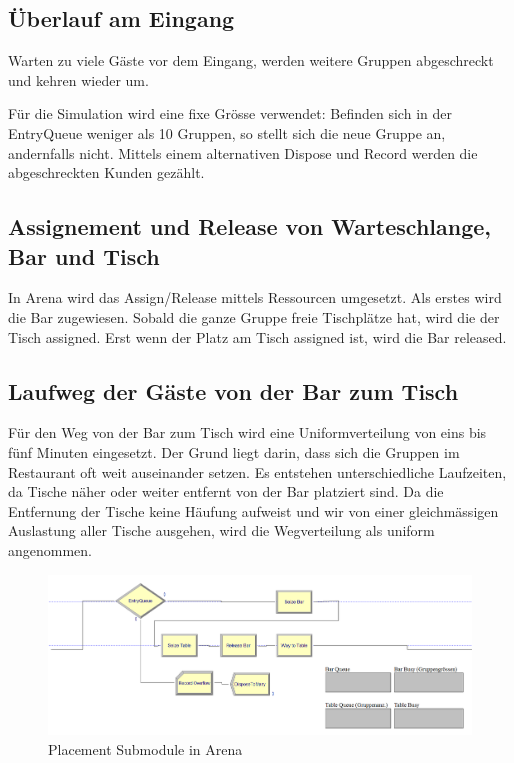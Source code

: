 \documentclass[ngerman,a4paper,12pt]{scrreprt}
\begin{document}
		\subsection{Überlauf am Eingang}
			Warten zu viele Gäste vor dem Eingang, werden weitere Gruppen abgeschreckt und kehren wieder um.
		
			Für die Simulation wird eine fixe Grösse verwendet: 			Befinden sich in der EntryQueue weniger als 10 Gruppen, so stellt sich die neue Gruppe an, andernfalls nicht. Mittels einem alternativen Dispose und Record werden die abgeschreckten Kunden gezählt.
			
			
		\subsection{Assignement und Release von Warteschlange, Bar und Tisch}
			In Arena wird das Assign/Release mittels Ressourcen umgesetzt. Als erstes wird die Bar zugewiesen. Sobald die ganze Gruppe freie Tischplätze hat, wird die der Tisch assigned. Erst wenn der Platz am Tisch assigned ist, wird die Bar released.
	
	
		\subsection{Laufweg der Gäste von der Bar zum Tisch}
			Für den Weg von der Bar zum Tisch wird eine Uniformverteilung von eins bis fünf Minuten eingesetzt. Der Grund liegt darin, dass sich die Gruppen im Restaurant oft weit auseinander setzen. Es entstehen unterschiedliche Laufzeiten, da Tische näher oder weiter entfernt von der Bar platziert sind. Da die Entfernung der Tische keine Häufung aufweist und wir von einer gleichmässigen Auslastung aller Tische ausgehen, wird die Wegverteilung als uniform angenommen.
	
			\begin{figure}[H]
				\includegraphics[width=\textwidth]{img/submodelPlacement.png}
				\caption[Placement Submodule Arena]{Placement Submodule in Arena}
				\label{placementSubmoduleArena}
			\end{figure}
	
\end{document}

